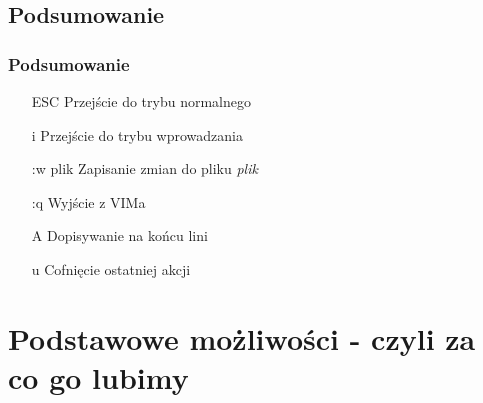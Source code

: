 \documentclass{beamer}
\begin{document}
\subsection{Podsumowanie}
\begin{frame}
	\frametitle{Podsumowanie}
	\begin{enumerate}
		\item [ESC] Przejście do trybu normalnego
		\item [i] Przejście do trybu wprowadzania
		\item [:w plik] Zapisanie zmian do pliku \textit{plik}
		\item [:q] Wyjście z VIMa
		\item [A] Dopisywanie na końcu lini
		\item [u] Cofnięcie ostatniej akcji
	\end{enumerate}
\end{frame}
\section{Podstawowe możliwości - czyli za co go lubimy}
\end{document}
